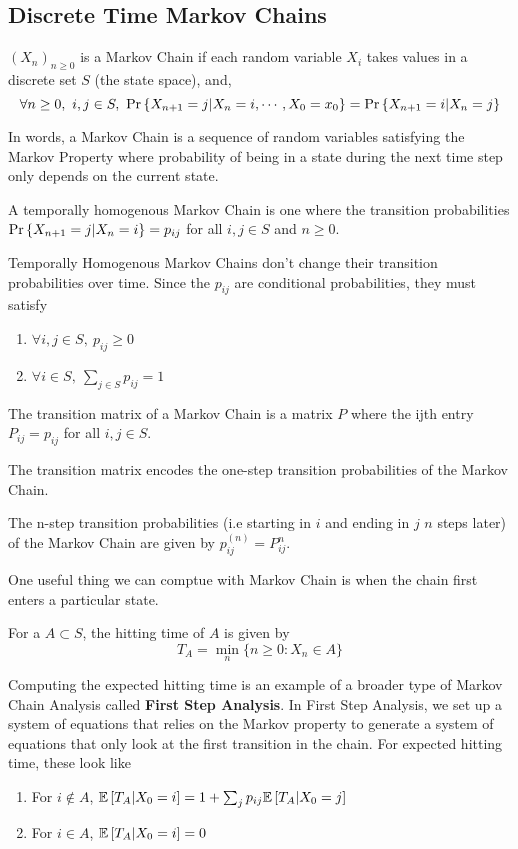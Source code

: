 \subsection{Discrete Time Markov Chains}
\begin{definition}
	$(X_n)_{n\geq 0}$ is a Markov Chain if each random variable $X_i$ takes values in a discrete set $S$ (the state space), and, \[
		\forall n \geq 0,\ i,j\in S,\ \pr{X_{n+1}=j|X_n=i,\cdots,X_0=x_0} = \pr{X_{n+1}=i|X_n=j}
	\]
	\label{defn:markov-chain}
\end{definition}
In words, a Markov Chain is a sequence of random variables satisfying the Markov Property where probability of being in a state during the next time step only depends on the current state.
\begin{definition}
	A temporally homogenous Markov Chain is one where the transition probabilities $\text{Pr}\left\{X_{n+1}=j|X_n=i\right\} = p_{ij}$ for all $i,j\in S$ and $n\geq 0$.
	\label{defn:temp-homo-markov-chain}
\end{definition}
Temporally Homogenous Markov Chains don't change their transition probabilities over time.
Since the $p_{ij}$ are conditional probabilities, they must satisfy
\begin{enumerate}
	\item $\forall i,j\in S,\ p_{ij} \geq 0$
	\item $\forall i\in S,\ \sum_{j\in S}p_{ij} = 1$
\end{enumerate}
\begin{definition}
	The transition matrix of a Markov Chain is a matrix $P$ where the ijth entry $P_{ij} = p_{ij}$ for all $i,j\in S$.
	\label{defn:transition-mat}
\end{definition}
The transition matrix encodes the one-step transition probabilities of the Markov Chain.
\begin{theorem}
	The n-step transition probabilities (i.e starting in $i$ and ending in $j$ $n$ steps later) of the Markov Chain are given by $p_{ij}^{(n)} = P^n_{ij}$.
	\label{thm:chapman-kolmogorov}
\end{theorem}
One useful thing we can comptue with Markov Chain is when the chain first enters a particular state.
\begin{definition}
	For a $A \subset S$, the hitting time of $A$ is given by \[
		T_A = \min_n \{ n\geq 0: X_n\in A\}
	\]
	\label{defn:hitting-time}
\end{definition}
Computing the expected hitting time is an example of a broader type of Markov Chain Analysis called \textbf{First Step Analysis}.
In First Step Analysis, we set up a system of equations that relies on the Markov property to generate a system of equations that only look at the first transition in the chain.
For expected hitting time, these look like
\begin{enumerate}
	\item For $i\not\in A$, $\mathbb{E}\left[T_A|X_0 = i\right] = 1 + \sum_j p_{ij} \mathbb{E}\left[T_A|X_0 = j\right]$
	\item For $i\in A$, $\mathbb{E}\left[T_A|X_0 = i\right] = 0$
\end{enumerate}
